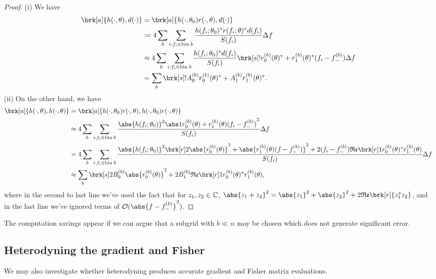 \begin{proof}
(i) We have
\begin{align*}
\brk[a]{h(\cdot, \theta), d(\cdot)} &= \brk[a]{h(\cdot,\theta_0) r(\cdot,\theta), d(\cdot)}\\
&\defn 4 \sum_{b} \sum_{i:f_i \in \text{bin} \; b} \frac{h(f_i;\theta_0)^* r(f_i;\theta)^* d(f_i) }{S(f_i)}\Delta f \\
&\approx 4 \sum_{b} \sum_{i:f_i \in \text{bin} \; b} \frac{h(f_i;\theta_0)^* d(f_i) }{S(f_i)} \brk[s]!{r_0^{(b)}(\theta)^* + r_1^{(b)}(\theta)^*(f_i - f_-^{(b)})} \Delta f\\
&= \sum_b \brk[s]!{A_0^{(b)} r_0^{(b)}(\theta)^* + A_1^{(b)} r_1^{(b)}(\theta)^*}.
\end{align*}
(ii) On the other hand, we have
\begin{align*}
\brk[a]{h(\cdot,\theta), h(\cdot,\theta)} &= \brk[a]{h(\cdot,\theta_0) r(\cdot,\theta), h(\cdot,\theta_0) r(\cdot,\theta)}\\
&\approx 4 \sum_b \sum_{i:f_i \in \text{bin} \; b} \frac{\abs{h(f_i;\theta_0)}^2 \abs1{r_0^{(b)}(\theta) + r_1^{(b)}(\theta) (f_i-f_-^{(b)})}^2}{S(f_i)}\Delta f \\
&= 4 \sum_b \sum_{i:f_i \in \text{bin} \; b}\frac{\abs{h(f_i;\theta_0)}^2 \brk[r]2{\abs{r_0^{(b)}(\theta)}^2 + \abs{r_1^{(b)}(\theta)(f-f_-^{(b)})}^2 + 2(f_i-f_-^{(b)}) \re \brk[r]1{r_0^{(b)}(\theta)^*r_1^{(b)}(\theta)}}}{S(f_i)}\Delta f \\
&\approx \sum_b \brk[s]2{B_0^{(b)} \abs{r_0^{(b)}(\theta)}^2 + 2B_1^{(b)} \re \brk[r]1{r_0^{(b)}(\theta)^* r_1^{(b)}(\theta)}},
\end{align*}
where in the second to last line we've used the fact that for $z_1, z_2 \in \mathbb{C}$, $\abs{z_1+z_2}^2 = \abs{z_1}^2 + \abs{z_2}^2 + 2 \re \brk[r]{z_1^* z_2}$, and in the last line we've ignored terms of $\order(\abs{f-f_-^{(b)}}^2)$.
\end{proof}
The computation savings appear if we can argue that a subgrid with $b \ll n$ may be chosen which does not generate significant error.
\subsection{Heterodyning the gradient and Fisher}
We may also investigate whether heterodyning produces accurate gradient and Fisher matrix evaluations.

